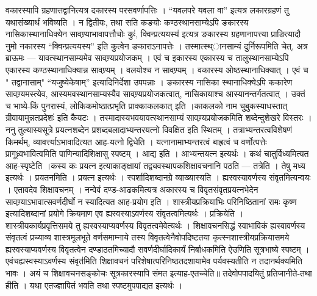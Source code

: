वकारस्यापि ग्रहणात्तद्वानित्यत्र दकारस्य परसवर्णापत्तिः । ``यवलपरे यवला
वा'' इत्यत्र लकारग्रहणं तु यथासंख्यार्थं भविष्यति । न द्वितीयः, तथा सति
कङयोः कण्ठस्थानसाम्येऽपि ङकारस्य नासिकास्थानाधिक्येन
सावण्र्याभावापत्तौचोः कुः॑, क्विन्प्रत्ययस्य॑ इत्यत्र ङकारस्य
ग्रहणानापत्त्या प्राङित्यादौ नुमो नकारस्य ``क्विन्प्रत्ययस्य'' इति
कुत्वेन ङकाराऽनापत्तेः । तस्मात्स्थ्ानसाम्यं दुर्निरूपमिति चेत्, अत्र
ब्राऊमः --- यावत्स्थानसाम्यमेव सावण्र्यप्रयोजकम् । एवं च इकारस्य एकारस्य
च तालुस्थानसाम्येऽपि एकारस्य कण्ठस्थानाधिक्यान्न सावण्र्यम् । वलयोश्च न
सावण्र्यम् । वकारस्य ओष्ठस्थानाधिक्यात् । एवं च " तद्वानासाम्"
``यजुष्येकेषाम्'' इत्यादिनिर्देशा उपपन्नाः । ङकारस्य नासिका
स्थानाधिक्येऽपि ककारेण सावण्र्यमस्त्येव, आस्यमवस्थानसाम्यस्यैव
सावण्र्यप्रयोजकत्वात्, नासिकायाश्च आस्यानन्तर्गतत्वात् । उक्तं च
भाष्ये-किं पुनरास्यं, लोकिकमोष्ठात्प्रभृति प्राक्काकलकात् इति ।काकलको
नाम चुबुकस्याधस्तात् ग्रीवायामुन्नतप्रदेशः॑ इति कैयटः ।
तस्मादास्यभवयावत्स्थानसाम्यं सावण्र्यप्रयोजकमिति शब्देन्दुशेखरे विस्तरः
।ननु तुल्यास्यसूत्रे प्रयत्नशब्देन प्रशब्दबलादाभ्यन्तरयत्नो विवक्षित इति
स्थितम् । तत्राभ्यन्तरत्वविशेषणं किमर्थम्, व्यावर्त्त्याऽभावादित्यत
आह-यत्नो द्विधेति । यत्नानामाभ्यन्तरत्वं बाह्रत्वं च वर्णोत्पत्तेः
प्रागूध्र्वभावित्वमिति पाणिन्यादिशिक्षासु स्पष्टम् । आद्य इति ।
आभ्यन्तयत्न इत्यर्थः । कथं चातुर्विध्यमित्यत आह-स्पृष्टेति ।कस्य कः
प्रयत्न इत्याकाङ्क्षायां तद्व्यवस्थापकशिक्षावचनानि पठति --- तत्रेति ।
तेषु मध्य इत्यर्थः । प्रयतनमिति । प्रयत्न इत्यर्थः । स्पर्शादिशब्दानग्रे
व्याख्यास्यति । ह्यस्वस्यावर्णस्य संवृतमित्यन्वयः । एतावदेव शिक्षावचनम्
। नन्वेवं दण्ड-आढकमित्यत्र अकारस्य च विवृतसंवृतप्रयत्नभेदेन
सावण्र्याऽभावात्सवर्णदीर्घो न स्यादित्यत आह-प्रयोग इति ।
शास्त्रीयप्रक्रियाभिः परिनिष्ठितानां रामः कृष्ण इत्यादिशब्दानां प्रयोगे
क्रियमाण एव ह्यस्वस्याऽवर्णस्य संवृतत्वमित्यर्थः । प्रक्रियेति ।
शास्त्रीयकार्यप्रवृत्तिसमये तु ह्यस्वस्याप्यवर्णस्य विवृतत्वमेवेत्यर्थः
। शिक्षावचनसिद्धं स्वाभाविकं ह्यस्वावर्णस्य संवृतत्वं प्रच्याव्य
शास्त्रमूलभूते वर्णसमाम्नाये तस्य विवृतत्वेनैवोपदिष्टतया
कृत्स्नशास्त्रीयप्रक्रियासमये ह्यस्वस्याप्यवर्णस्य विवृतत्वेन
दण्डाठतमिच्यादौ सवर्णदीर्घादिकार्यं निर्बाधकमिति ऐउणिति सूत्रभाष्ये
स्पष्टम् । एवंचह्यस्वस्याऽवर्णस्य संवृत॑मिति शिक्षावचनं
परिशेषात्परिनिष्ठतदशायामेव पर्यवस्यतीति न तदानर्थक्यमिति भावः । अयं च
शिक्षावचनसङ्कोचः सूत्रकारस्यापि संमत इत्याह-एतच्चेति॥ तदेवोपपादयितुं
प्रतिजानीते-तथा हीति । यथा एतज्ज्ञापितं भवति तथा स्पष्टमुपपाद्यत
इत्यर्थः ।
